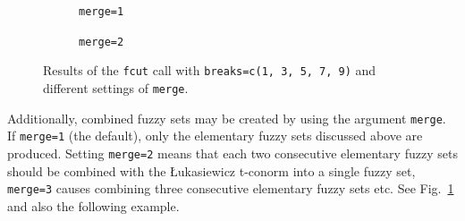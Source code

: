 \documentclass[review]{elsarticle}
\newcommand{\code}[1]{\texttt{#1}}
\begin{document}
\begin{figure}
    \centering
    \newsavebox{\largestimage}
    \begin{subfigure}[b]{0.49\textwidth}
        \centering
        \usebox{\largestimage}
        \caption{\code{merge=1}}
    \end{subfigure}
    \begin{subfigure}[b]{0.49\textwidth}
        \centering
        \caption{\code{merge=2}}
    \end{subfigure}
    \caption{Results of the \code{fcut} call with \code{breaks=c(1, 3, 5, 7, 9)} and different settings of \code{merge}.}
    \label{fig:fcut}
\end{figure}



Additionally, combined fuzzy sets may be created by using the argument \code{merge}. If \code{merge=1} (the default), only the elementary fuzzy sets discussed above are produced. 
Setting \code{merge=2} means that each two consecutive elementary fuzzy sets should be combined with the \L{}ukasiewicz t-conorm into a single fuzzy set, \code{merge=3} causes combining three consecutive elementary fuzzy sets etc. See Fig.~\ref{fig:fcut} and also the following example.
\end{document}
